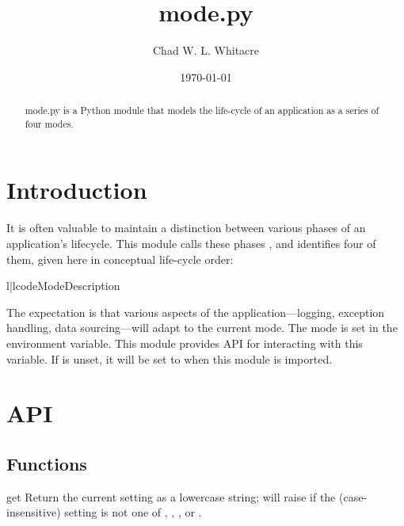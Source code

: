 \documentclass{manual}
\title{mode.py}
\author{Chad W. L. Whitacre}
\date\today
\begin{document}
\maketitle

\begin{abstract}

\noindent
mode.py is a Python module that models the life-cycle of an application as a
series of four modes.

\end{abstract}

\chapter{Introduction}

It is often valuable to maintain a distinction between various phases of an
application's lifecycle. This module calls these phases , and
identifies four of them, given here in conceptual life-cycle order:

\begin{tableii}{l|l}{code}{Mode}{Description}
\end{tableii}


The expectation is that various aspects of the application---logging, exception
handling, data sourcing---will adapt to the current mode. The mode is set in the
 environment variable. This module provides API for
interacting with this variable. If  is unset, it will be set
to  when this module is imported.

\chapter{API}

\section{Functions}

\begin{funcdesc}{get}{}
Return the current  setting as a lowercase string; will raise
 if the (case-insensitive) setting is not one of
, , , or .
\end{funcdesc}
\end{document}
